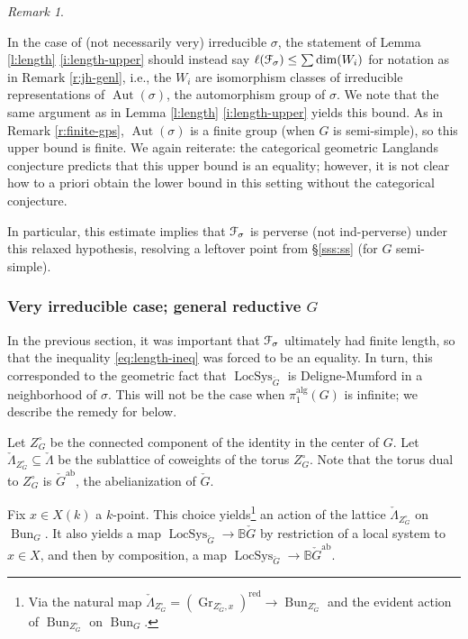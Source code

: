 \documentclass[reqno,11pt]{amsart}
\numberwithin{equation}{subsection}
\theoremstyle{remark}
\newtheorem{rem}[thm]{Remark}
\newcommand{\bB}{{\mathbb B}}
\newcommand{\sF}{{\EuScript F}}
\newcommand{\on}{\operatorname}
\newcommand{\Aut}{\on{Aut}}
\newcommand{\Gr}{\on{Gr}}
\newcommand{\Bun}{\on{Bun}}
\newcommand{\LocSys}{\on{LocSys}}
\renewcommand{\subset}{\subseteq}
\begin{document}
\begin{rem}\label{r:not-very-1}

In the case of (not necessarily very) irreducible $\sigma$, 
the statement of Lemma \ref{l:length} \eqref{i:length-upper}
should instead say $\ell(\sF_{\sigma}) \leq \sum \dim(W_i)$ for
notation as in Remark \ref{r:jh-genl}, i.e., the $W_i$ are isomorphism
classes of irreducible representations of $\Aut(\sigma)$, 
the automorphism group of $\sigma$. We note that the 
same argument as in Lemma \ref{l:length} \eqref{i:length-upper} yields
this bound. As in Remark \ref{r:finite-gps}, 
$\Aut(\sigma)$ is a finite group (when $G$ is semi-simple), so 
this upper bound is finite. We again reiterate: the categorical geometric Langlands
conjecture predicts that this upper bound is an equality; however, 
it is not clear how to a priori obtain the lower bound in this
setting without the categorical conjecture.

In particular, this estimate implies that $\sF_{\sigma}$ is perverse (not ind-perverse)
under this relaxed hypothesis, resolving a leftover point from 
\S \ref{sss:ss} (for $G$ semi-simple).

\end{rem}


\subsubsection{Very irreducible case; general reductive $G$}\label{sss:red}

In the previous section, it was important that $\sF_{\sigma}$ ultimately
had finite length, so that the inequality \eqref{eq:length-ineq} was 
forced to be an equality. In turn, this corresponded to the geometric fact that
$\LocSys_{\check{G}}$ is Deligne-Mumford in a neighborhood of $\sigma$.
This will not be the case when  $\pi_1^{\on{alg}}(G)$ is infinite; 
we describe the remedy for below.

Let $Z_G^\circ$ be the connected component of the identity in the 
center of $G$. Let $\check{\Lambda}_{Z_G^\circ} 
\subset \check{\Lambda}$ be the sublattice of coweights of the torus
$Z_G^\circ$. Note that the torus dual to $Z_G^\circ$ is $\check{G}^{\on{ab}}$, 
the abelianization of $\check{G}$. 

Fix $x \in X(k)$ a $k$-point. This choice yields\footnote{Via 
the natural map $\check{\Lambda}_{Z_G^\circ} = 
(\Gr_{Z_G^\circ,x})^{\on{red}} \to \Bun_{Z_G^{\circ}}$ and the evident
action of $\Bun_{Z_G^{\circ}}$ on $\Bun_G$.}
an action of the lattice $\check{\Lambda}_{Z_G^\circ}$ on $\Bun_G$.
It also yields a map $\LocSys_{\check{G}} \to \bB\check{G}$ by
restriction of a local system to $x \in X$, and then by 
composition, a map $\LocSys_{\check{G}} \to \bB\check{G}^{\on{ab}}$.
\end{document}
